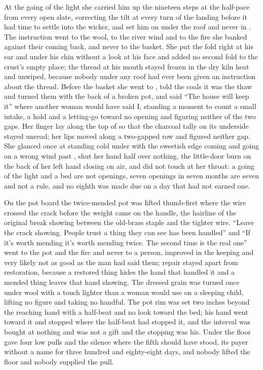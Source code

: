 At the going of the light she carried him up the nineteen steps at the half-pace from every open slate, correcting the tilt at every turn of the landing before it had time to settle into the wicker, and set him on  under the roof and never in . The instruction went to the wool, to the river wind and to the fire she banked against their coming back, and never to the basket. She put the fold right at his ear and under his chin without a look at his face and added no second fold to the crust's empty place; the thread at his mouth stayed frozen in the dry kiln heat and unwiped, because nobody under any roof had ever been given an instruction about the thread. Before the basket she went to , told the coals it was the thaw and turned them with the back of a broken pot, and said “The house will keep it” where another woman would have said I, standing a moment to count a small intake, a hold and a letting-go toward no opening and figuring neither of the two gaps. Her finger lay along the top of  so that the charcoal tally on its underside stayed unread; her lips moved along a two-gapped row and figured neither gap. She glanced once at  standing cold under  with the sweetish edge coming and going on a wrong wind past , shut her hand half over nothing, the little-door burn on the back of her left hand closing on air, and did not touch  at her throat: a going of the light and a bed are not openings, seven openings in seven months are seven and not a rule, and no eighth was made due on a day that had not earned one.

On the pot board the twice-mended pot was lifted thumb-first where the wire crossed the crack before the weight came on the handle, the hairline of the original break showing between the old-brass staple and the tighter wire. “Leave the crack showing. People trust a thing they can see has been handled” and “If it's worth mending it's worth mending twice. The second time is the real one” went to the pot and the fire and never to a person, improved in the keeping and very likely not as good as the man had said them; repair stayed apart from restoration, because a restored thing hides the hand that handled it and a mended thing leaves that hand showing. The dressed grain was turned once under wool with a touch lighter than a woman would use on a sleeping child, lifting no figure and taking no handful. The pot rim was set two inches beyond the reaching hand with a half-beat and no look toward the bed; his hand went toward it and stopped where the half-beat had stopped it, and the interval was bought at nothing and was not a gift and the stopping was his. Under the floor  gave four low pulls and the silence where the fifth should have stood, its payer without a name for three hundred and eighty-eight days, and nobody lifted the floor and nobody supplied the pull.

